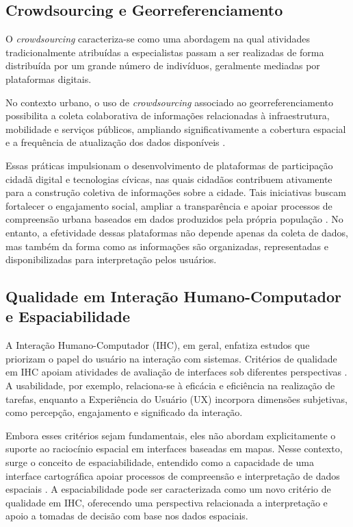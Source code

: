 \documentclass[12pt]{article}
\begin{document}
\subsection{Crowdsourcing e Georreferenciamento}

O \textit{crowdsourcing} caracteriza-se como uma abordagem na qual atividades tradicionalmente atribuídas a especialistas passam a ser realizadas de forma distribuída por um grande número de indivíduos, geralmente mediadas por plataformas digitais. 

No contexto urbano, o uso de \textit{crowdsourcing} associado ao georreferenciamento possibilita a coleta colaborativa de informações relacionadas à infraestrutura, mobilidade e serviços públicos, ampliando significativamente a cobertura espacial e a frequência de atualização dos dados disponíveis \cite{sui:2013,haklay:2012}. 


Essas práticas impulsionam o desenvolvimento de plataformas de participação cidadã digital e tecnologias cívicas, nas quais cidadãos contribuem ativamente para a construção coletiva de informações sobre a cidade. Tais iniciativas buscam fortalecer o engajamento social, ampliar a transparência e apoiar processos de compreensão urbana baseados em dados produzidos pela própria população \cite{gonzaga:2025,afzalan:2017}. No entanto, a efetividade dessas plataformas não depende apenas da coleta de dados, mas também da forma como as informações são organizadas, representadas e disponibilizadas para interpretação pelos usuários.




\subsection{Qualidade em Interação Humano-Computador e Espaciabilidade}
A Interação Humano-Computador (IHC), em geral, enfatiza estudos que priorizam o papel do usuário na interação com sistemas. Critérios de qualidade em IHC apoiam atividades de avaliação de interfaces sob diferentes perspectivas \cite{barbosa2010interaccao}. A usabilidade, por exemplo, relaciona-se à eficácia e eficiência na realização de tarefas, enquanto a Experiência do Usuário (UX) incorpora dimensões subjetivas, como percepção, engajamento e significado da interação.

Embora esses critérios sejam fundamentais, eles não abordam explicitamente o suporte ao raciocínio espacial em interfaces baseadas em mapas. Nesse contexto, surge o conceito de espaciabilidade, entendido como a capacidade de uma interface cartográfica apoiar processos de compreensão e interpretação de dados espaciais \cite{neto:ihc}. A espaciabilidade pode ser caracterizada como um novo critério de qualidade em IHC, oferecendo uma perspectiva relacionada a interpretação e apoio a tomadas de decisão com base nos dados espaciais.
\end{document}
